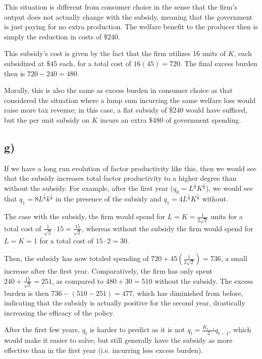 \documentclass[12pt,letterpaper]{article}
\theoremstyle{definition}
\begin{document}
This situation is different from consumer choice in the sense that the firm's
output does not actually change with the subsidy, meaning that the government is
just paying for no extra production. The welfare benefit to the producer then is
simply the reduction in costs of $\$240$.

This subsidy's cost is given by the fact that the firm utilizes 16 units of $K$, each
subsidized at $\$45$ each, for a total cost of $16(45) = 720$. The final excess
burden then is $720 - 240 = 480$.

Morally, this is also the same as excess burden in consumer choice as that
considered the situation where a lump sum incurring the same welfare loss would
raise more tax revenue; in this case, a flat subsidy of $\$240$ would have
sufficed, but the per unit subsidy on $K$ incurs an extra $\$480$ of government spending.

\subsection*{g)}


If we have a long run evolution of factor productivity like this, then we would
see that the subsidy increases total factor productivity to a higher degree than
without the subsidy. For example, after the first year ($q_0 =
L^{\frac{1}{3}}K^{\frac{1}{3}}$), we would see that $q_1 =
8L^{\frac{1}{3}}k^{\frac{1}{3}}$ in the presence of the subsidy and $q_1 =
4L^{\frac{1}{3}}K^{\frac{1}{3}}$ without.

The case with the subsidy, the firm would spend for $L = K =
\frac{1}{2\sqrt{2}}$ units for a total cost of $\frac{1}{\sqrt{2}} \cdot 15 =
\frac{15}{\sqrt{2}}$, whereas without the subsidy the firm would spend for $L =
K = 1$ for a total cost of $15\cdot 2 = 30$.

Then, the subsidy has now totaled spending of $720 + 45(\frac{1}{2\sqrt{2}}) =
736$, a small increase after the first year. Comparatively, the firm has only
spent $240 + \frac{15}{\sqrt{2}} = 251$, as compared to $480 + 30 = 510$ without
the subsidy. The excess burden is then $736 - (510-251) = 477$, which has
diminished from before, indicating that the subsidy is actually positive for the
second year, drastically increasing the efficacy of the policy.

After the first few years, $q_t$ is harder to predict as it is not $q_t =
\frac{K_{t-1}}{2}q_{t-1}$, which would make it easier to solve, but still
generally have the subsidy as more effective than in the first year (i.e.
incurring less excess burden).
\end{document}
